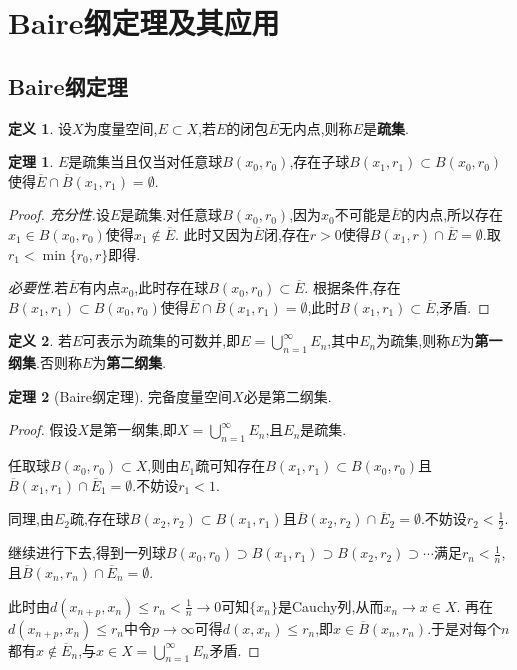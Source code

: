\documentclass{ctexart}
\theoremstyle{definition}
\newtheorem{definition}{定义}
\newtheorem{theorem}{定理}
\theoremstyle{remark}
\begin{document}
	\newpage
	
	\section{Baire纲定理及其应用}
	
	\subsection{Baire纲定理}
	
	\begin{definition}
		设$X$为度量空间,$E\subset X$,若$E$的闭包$\overline{E}$无内点,则称$E$是\textbf{疏集}.
	\end{definition}
	\begin{theorem}
		$E$是疏集当且仅当对任意球$B(x_0,r_0)$,存在子球$B(x_1,r_1)\subset B(x_0,r_0)$使得$\overline{E}\cap\overline{B}(x_1,r_1)=\emptyset$.
	\end{theorem}
	\begin{proof}
		\textit{充分性.}设$E$是疏集.对任意球$B(x_0,r_0)$,因为$x_0$不可能是$\overline{E}$的内点,所以存在$x_1\in B(x_0,r_0)$使得$x_1\notin\overline{E}$.
		此时又因为$\overline{E}$闭,存在$r>0$使得$B(x_1,r)\cap\overline{E}=\emptyset$.取$r_1<\min\{r_0,r\}$即得.
		
		\textit{必要性.}若$\overline{E}$有内点$x_0$,此时存在球$B(x_0,r_0)\subset\overline{E}$.
		根据条件,存在$B(x_1,r_1)\subset B(x_0,r_0)$使得$\overline{E}\cap\overline{B}(x_1,r_1)=\emptyset$,此时$B(x_1,r_1)\subset\overline{E}$,矛盾.
	\end{proof}
	
	\begin{definition}
		若$E$可表示为疏集的可数并,即$E=\bigcup_{n=1}^\infty{E_n}$,其中$E_n$为疏集,则称$E$为\textbf{第一纲集}.否则称$E$为\textbf{第二纲集}.
	\end{definition}
	\begin{theorem}[Baire纲定理]
		完备度量空间$X$必是第二纲集.
	\end{theorem}
	\begin{proof}
		假设$X$是第一纲集,即$X=\bigcup_{n=1}^\infty{E_n}$,且$E_n$是疏集.
		
		任取球$B(x_0,r_0)\subset X$,则由$E_1$疏可知存在$B(x_1,r_1)\subset B(x_0,r_0)$且$\overline{B}(x_1,r_1)\cap\overline{E}_1=\emptyset$.不妨设$r_1<1$.
		
		同理,由$E_2$疏,存在球$B(x_2,r_2)\subset B(x_1,r_1)$且$\overline{B}(x_2,r_2)\cap\overline{E}_2=\emptyset$.不妨设$r_2<\frac{1}{2}$.
		
		继续进行下去,得到一列球$B(x_0,r_0)\supset B(x_1,r_1)\supset B(x_2,r_2)\supset\cdots$满足$r_n<\frac{1}{n}$,且$\overline{B}(x_n,r_n)\cap\overline{E}_n=\emptyset$.
		
		此时由$d(x_{n+p},x_n)\le r_n<\frac{1}{n}\to 0$可知$\{x_n\}$是Cauchy列,从而$x_n\to x\in X$.
		再在$d(x_{n+p},x_n)\le r_n$中令$p\to\infty$可得$d(x,x_n)\le r_n$,即$x\in\overline{B}(x_n,r_n)$.于是对每个$n$都有$x\notin\overline{E}_n$,与$x\in X=\bigcup_{n=1}^\infty{E_n}$矛盾.
	\end{proof}
	
\end{document}

